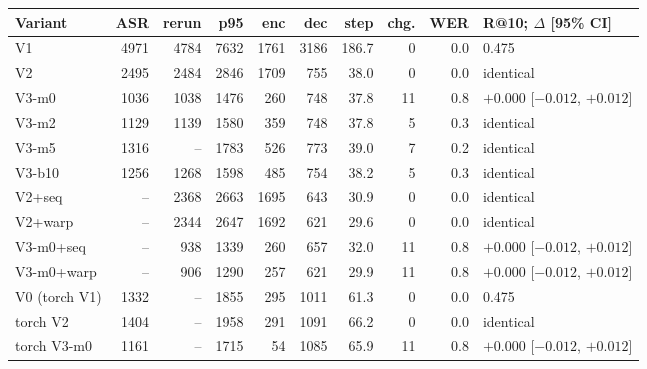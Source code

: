 \begin{tabular}{lrrrrrrrrl}
\toprule
Variant & ASR & rerun & p95 & enc & dec & step & chg. & WER & R@10; $\Delta$ [95\% CI] \\
\midrule
V1 & 4971 & 4784 & 7632 & 1761 & 3186 & 186.7 & 0 & 0.0 & 0.475 \\
V2 & 2495 & 2484 & 2846 & 1709 & 755 & 38.0 & 0 & 0.0 & identical \\
V3-m0 & 1036 & 1038 & 1476 & 260 & 748 & 37.8 & 11 & 0.8 & $+0.000$ [$-0.012$, $+0.012$] \\
V3-m2 & 1129 & 1139 & 1580 & 359 & 748 & 37.8 & 5 & 0.3 & identical \\
V3-m5 & 1316 & -- & 1783 & 526 & 773 & 39.0 & 7 & 0.2 & identical \\
V3-b10 & 1256 & 1268 & 1598 & 485 & 754 & 38.2 & 5 & 0.3 & identical \\
\midrule
V2+seq & -- & 2368 & 2663 & 1695 & 643 & 30.9 & 0 & 0.0 & identical \\
V2+warp & -- & 2344 & 2647 & 1692 & 621 & 29.6 & 0 & 0.0 & identical \\
V3-m0+seq & -- & 938 & 1339 & 260 & 657 & 32.0 & 11 & 0.8 & $+0.000$ [$-0.012$, $+0.012$] \\
V3-m0+warp & -- & 906 & 1290 & 257 & 621 & 29.9 & 11 & 0.8 & $+0.000$ [$-0.012$, $+0.012$] \\
\midrule
V0 (torch V1) & 1332 & -- & 1855 & 295 & 1011 & 61.3 & 0 & 0.0 & 0.475 \\
torch V2 & 1404 & -- & 1958 & 291 & 1091 & 66.2 & 0 & 0.0 & identical \\
torch V3-m0 & 1161 & -- & 1715 & 54 & 1085 & 65.9 & 11 & 0.8 & $+0.000$ [$-0.012$, $+0.012$] \\
\bottomrule
\end{tabular}
